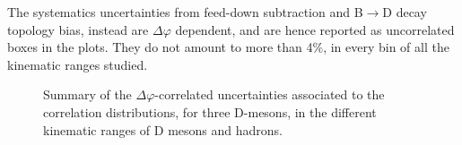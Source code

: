 The systematics uncertainties from feed-down subtraction and B$\rightarrow$D decay topology bias, instead are $\Delta\varphi$ dependent, and are hence reported as uncorrelated boxes in the plots.  They do not amount to more than 4\%, in every bin of all the kinematic ranges studied.
\begin{figure}[h]
\centering
{}
\caption{Summary of the $\Delta\varphi$-correlated uncertainties associated to the correlation distributions, for three D-mesons, in the different kinematic ranges of D mesons and hadrons.}
\label{fig:SystOverall}
\end{figure}
